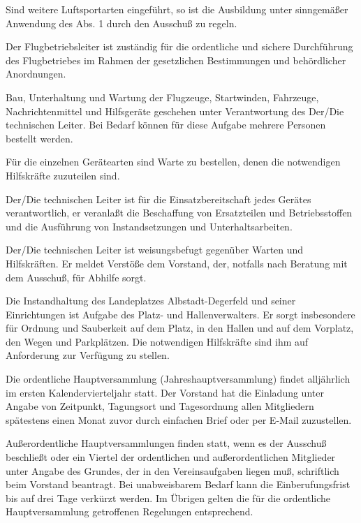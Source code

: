 \documentclass[11pt,a4paper,parskip=half]{scrartcl}
\begin{document}
\begin{contract}
\begin{multicols}{2}
    Sind weitere Luftsportarten eingeführt,
    so ist die Ausbildung unter sinngemäßer Anwendung des Abs. 1 durch den Ausschuß zu regeln.

    Der Flugbetriebsleiter ist zuständig für die ordentliche und sichere Durchführung des Flugbetriebes im Rahmen der gesetzlichen Bestimmungen und behördlicher Anordnungen.

    Bau,
    Unterhaltung und Wartung der Flugzeuge,
    Startwinden,
    Fahrzeuge,
    Nachrichtenmittel und Hilfsgeräte geschehen unter Verantwortung des Der/Die technischen Leiter. Bei Bedarf können für diese Aufgabe mehrere Personen bestellt werden.

    Für die einzelnen Gerätearten sind Warte zu bestellen,
    denen die notwendigen Hilfskräfte zuzuteilen sind.

    Der/Die technischen Leiter ist für die Einsatzbereitschaft jedes Gerätes verantwortlich,
    er veranlaßt die Beschaffung von Ersatzteilen und Betriebsstoffen und die Ausführung von Instandsetzungen und Unterhaltsarbeiten.

    Der/Die technischen Leiter ist weisungsbefugt gegenüber Warten und Hilfskräften.
    Er meldet Verstöße dem Vorstand,
    der,
    notfalls nach Beratung mit dem Ausschuß,
    für Abhilfe sorgt.

    Die Instandhaltung des Landeplatzes Albstadt-Degerfeld und seiner Einrichtungen ist Aufgabe des Platz- und Hallenverwalters.
    Er sorgt insbesondere für Ordnung und Sauberkeit auf dem Platz,
    in den Hallen und auf dem Vorplatz,
    den Wegen und Parkplätzen.
    Die notwendigen Hilfskräfte sind ihm auf Anforderung zur Verfügung zu stellen.

    Die ordentliche Hauptversammlung (Jahreshauptversammlung) findet alljährlich im ersten Kalendervierteljahr statt.
    Der Vorstand hat die Einladung unter Angabe von Zeitpunkt,
    Tagungsort und Tagesordnung allen Mitgliedern spätestens einen Monat zuvor durch einfachen Brief oder per E-Mail zuzustellen.

    Außerordentliche Hauptversammlungen finden statt,
    wenn es der Ausschuß beschließt oder ein Viertel der ordentlichen und außerordentlichen Mitglieder unter Angabe des Grundes,
    der in den Vereinsaufgaben liegen muß,
    schriftlich beim Vorstand beantragt.
    Bei unabweisbarem Bedarf kann die Einberufungsfrist bis auf drei Tage verkürzt werden.
    Im Übrigen gelten die für die ordentliche Hauptversammlung getroffenen Regelungen entsprechend.


\end{multicols}
\end{contract}
\end{document}
